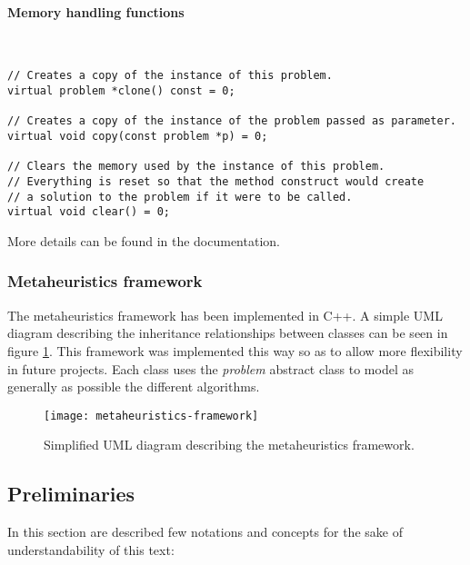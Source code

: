 \paragraph{Memory handling functions} \

\begin{lstlisting}
// Creates a copy of the instance of this problem.
virtual problem *clone() const = 0;

// Creates a copy of the instance of the problem passed as parameter.
virtual void copy(const problem *p) = 0;

// Clears the memory used by the instance of this problem.
// Everything is reset so that the method construct would create
// a solution to the problem if it were to be called.
virtual void clear() = 0;
\end{lstlisting}

More details can be found in the documentation.

\subsubsection{Metaheuristics framework}
\label{sec:metaheuristics:code:framework}

The metaheuristics framework has been implemented in C++. A simple UML diagram describing the
inheritance relationships between classes can be seen in figure \ref{fig:metaheuristics-UML}.
This framework was implemented this way so as to allow more flexibility in future projects.
Each class uses the \textit{problem} abstract class to model as generally as possible the
different algorithms.

\begin{figure}[H]
    \centering
    \texttt{[image: metaheuristics-framework]}
    \caption{Simplified UML diagram describing the metaheuristics framework.}
    \label{fig:metaheuristics-UML}
\end{figure}

\subsection{Preliminaries}
\label{sec:metaheuristics:preliminaries}

In this section are described few notations and concepts for the sake of understandability of
this text:


